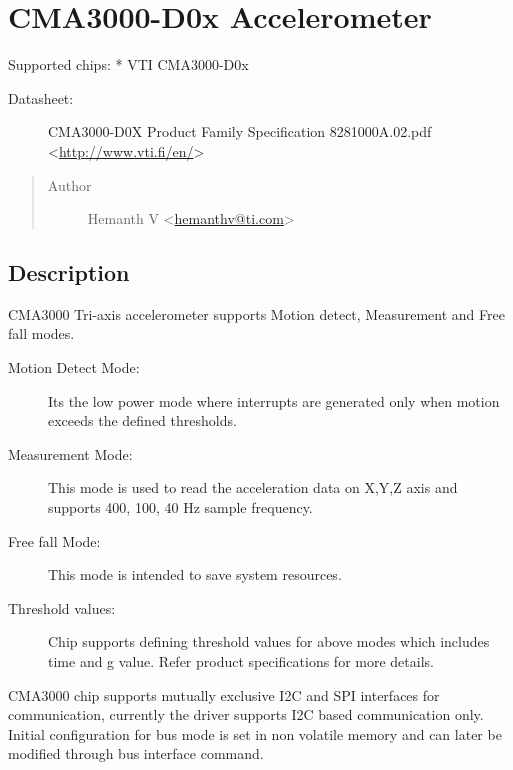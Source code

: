 \documentclass[a4paper,8pt,english]{sphinxmanual}
\begin{document}
\section{CMA3000-D0x Accelerometer}
\label{input/devices/cma3000_d0x:cma3000-d0x-accelerometer}\label{input/devices/cma3000_d0x::doc}
Supported chips:
* VTI CMA3000-D0x
\begin{description}
\item[{Datasheet:}] \leavevmode
CMA3000-D0X Product Family Specification 8281000A.02.pdf
\textless{}\href{http://www.vti.fi/en/}{http://www.vti.fi/en/}\textgreater{}

\end{description}
\begin{quote}\begin{description}
\item[{Author}] \leavevmode
Hemanth V \textless{}\href{mailto:hemanthv@ti.com}{hemanthv@ti.com}\textgreater{}

\end{description}\end{quote}


\subsection{Description}
\label{input/devices/cma3000_d0x:description}
CMA3000 Tri-axis accelerometer supports Motion detect, Measurement and
Free fall modes.
\begin{description}
\item[{Motion Detect Mode:}] \leavevmode
Its the low power mode where interrupts are generated only
when motion exceeds the defined thresholds.

\item[{Measurement Mode:}] \leavevmode
This mode is used to read the acceleration data on X,Y,Z
axis and supports 400, 100, 40 Hz sample frequency.

\item[{Free fall Mode:}] \leavevmode
This mode is intended to save system resources.

\item[{Threshold values:}] \leavevmode
Chip supports defining threshold values for above modes
which includes time and g value. Refer product specifications for
more details.

\end{description}

CMA3000 chip supports mutually exclusive I2C and SPI interfaces for
communication, currently the driver supports I2C based communication only.
Initial configuration for bus mode is set in non volatile memory and can later
be modified through bus interface command.
\end{document}

